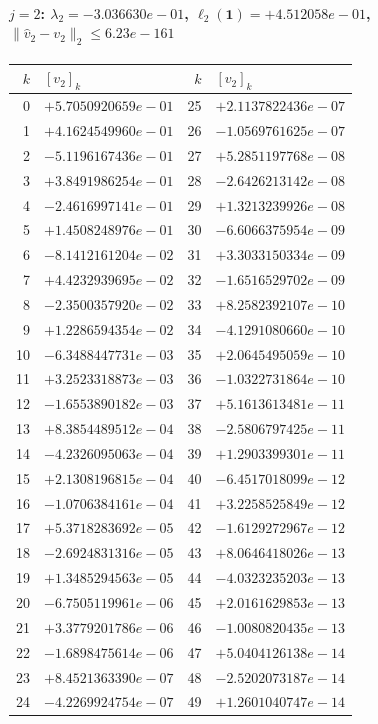 \documentclass[11pt]{article}
\begin{document}
\paragraph{$j = 2$: $\lambda_{2} = -3.036630e-01$, \quad $\ell_{2}(\mathbf{1}) = +4.512058e-01$, \quad $\|\hat{v}_{2} - v_{2}\|_2 \leq 6.23e-161$}
\begin{center}
{\footnotesize
\begin{tabular}{r@{\;\;}l@{\quad}r@{\;\;}l}
\toprule
$k$ & $[v_{2}]_k$ & $k$ & $[v_{2}]_k$ \\
\midrule
0 & $+5.7050920659e-01$ & 25 & $+2.1137822436e-07$ \\
1 & $+4.1624549960e-01$ & 26 & $-1.0569761625e-07$ \\
2 & $-5.1196167436e-01$ & 27 & $+5.2851197768e-08$ \\
3 & $+3.8491986254e-01$ & 28 & $-2.6426213142e-08$ \\
4 & $-2.4616997141e-01$ & 29 & $+1.3213239926e-08$ \\
5 & $+1.4508248976e-01$ & 30 & $-6.6066375954e-09$ \\
6 & $-8.1412161204e-02$ & 31 & $+3.3033150334e-09$ \\
7 & $+4.4232939695e-02$ & 32 & $-1.6516529702e-09$ \\
8 & $-2.3500357920e-02$ & 33 & $+8.2582392107e-10$ \\
9 & $+1.2286594354e-02$ & 34 & $-4.1291080660e-10$ \\
10 & $-6.3488447731e-03$ & 35 & $+2.0645495059e-10$ \\
11 & $+3.2523318873e-03$ & 36 & $-1.0322731864e-10$ \\
12 & $-1.6553890182e-03$ & 37 & $+5.1613613481e-11$ \\
13 & $+8.3854489512e-04$ & 38 & $-2.5806797425e-11$ \\
14 & $-4.2326095063e-04$ & 39 & $+1.2903399301e-11$ \\
15 & $+2.1308196815e-04$ & 40 & $-6.4517018099e-12$ \\
16 & $-1.0706384161e-04$ & 41 & $+3.2258525849e-12$ \\
17 & $+5.3718283692e-05$ & 42 & $-1.6129272967e-12$ \\
18 & $-2.6924831316e-05$ & 43 & $+8.0646418026e-13$ \\
19 & $+1.3485294563e-05$ & 44 & $-4.0323235203e-13$ \\
20 & $-6.7505119961e-06$ & 45 & $+2.0161629853e-13$ \\
21 & $+3.3779201786e-06$ & 46 & $-1.0080820435e-13$ \\
22 & $-1.6898475614e-06$ & 47 & $+5.0404126138e-14$ \\
23 & $+8.4521363390e-07$ & 48 & $-2.5202073187e-14$ \\
24 & $-4.2269924754e-07$ & 49 & $+1.2601040747e-14$ \\
\bottomrule
\end{tabular}
}
\end{center}
\end{document}
